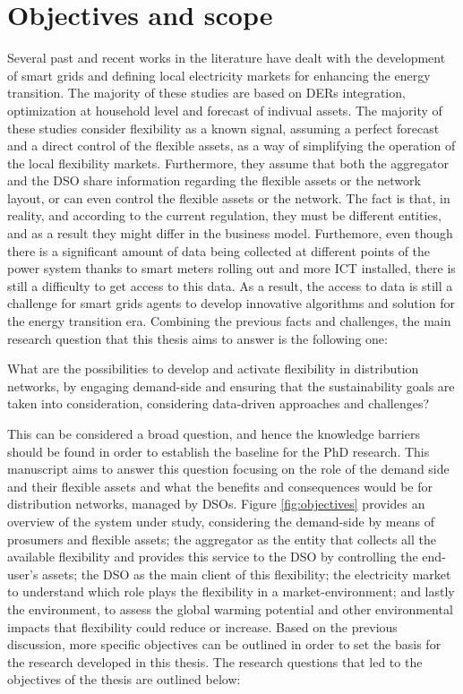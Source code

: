 \section{Objectives and scope}
Several past and recent works in the literature have dealt with the development of smart grids and defining local electricity markets for enhancing the energy transition. The majority of these studies are based on DERs integration, optimization at household level and forecast of indivual assets. The majority of these studies consider flexibility as a known signal, assuming a perfect forecast and a direct control of the flexible assets, as a way of simplifying the operation of the local flexibility markets. Furthermore, they assume that both the aggregator and the DSO share information regarding the flexible assets or the network layout, or can even control the flexible assets or the network. The fact is that, in reality, and according to the current regulation, they must be different entities, and as a result they might differ in the business model. Furthemore, even though there is a significant amount of data being collected at different points of the power system thanks to smart meters rolling out and more ICT installed, there is still a difficulty to get access to this data. As a result, the access to data is still a challenge for smart grids agents to develop innovative algorithms and solution for the energy transition era. Combining the previous facts and challenges, the main research question that this thesis aims to answer is the following one:

\vspace*{1mm}
\begin{tcolorbox}
What are the possibilities to develop and activate flexibility in distribution networks, by engaging demand-side and ensuring that the sustainability goals are taken into consideration, considering data-driven approaches and challenges? 
\end{tcolorbox}

This can be considered a broad question, and hence the knowledge barriers should be found in order to establish the baseline for the PhD research. This manuscript aims to answer this question focusing on the role of the demand side and their flexible assets and what the benefits and consequences would be for distribution networks, managed by DSOs. Figure \ref{fig:objectives} provides an overview of the system under study, considering the demand-side by means of prosumers and flexible assets; the aggregator as the entity that collects all the available flexibility and provides this service to the DSO by controlling the end-user's assets; the DSO as the main client of this flexibility; the electricity market to understand which role plays the flexibility in a market-environment; and lastly the environment, to assess the global warming potential and other environmental impacts that flexibility could reduce or increase. Based on the previous discussion, more specific objectives can be outlined in order to set the basis for the research developed in this thesis. The research questions that led to the objectives of the thesis are outlined below: 


